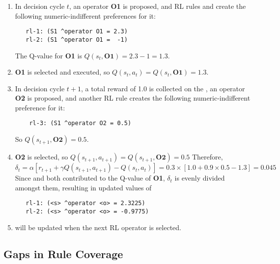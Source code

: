 \begin{enumerate}

\item In decision cycle $t$, an operator \textbf{O1} is proposed, and RL rules  and  create the following numeric-indifferent preferences for it:
\begin{verbatim}
   rl-1: (S1 ^operator O1 = 2.3)
   rl-2: (S1 ^operator O1 =  -1)
\end{verbatim}  
	The Q-value for \textbf{O1} is $Q(s_t, \textbf{O1}) = 2.3 - 1 = 1.3$.
	 
\item \textbf{O1} is selected and executed, so $Q(s_t, a_t) = Q(s_t, \textbf{O1}) = 1.3$.

\item In decision cycle $t+1$, a total reward of 1.0 is collected on the , an operator \textbf{O2} is proposed, and another RL rule  creates the following numeric-indifferent preference for it:
\begin{verbatim}
	rl-3: (S1 ^operator O2 = 0.5)
\end{verbatim}
	So $Q(s_{t+1}, \textbf{O2}) = 0.5$.

\item \textbf{O2} is selected, so $Q(s_{t+1}, a_{t+1}) = Q(s_{t+1}, \textbf{O2}) = 0.5$
	Therefore, 
	$$\delta_t = \alpha \left[r_{t+1} + \gamma Q(s_{t+1}, a_{t+1}) - Q(s_t, a_t) \right] = 0.3 \times [ 1.0 + 0.9 \times 0.5 - 1.3 ] = 0.045$$
	Since  and  both contributed to the Q-value of \textbf{O1}, $\delta_t$ is evenly divided amongst them, resulting in updated values of
\begin{verbatim}
   rl-1: (<s> ^operator <o> = 2.3225)
   rl-2: (<s> ^operator <o> = -0.9775)
\end{verbatim}

\item {} will be updated when the next RL operator is selected.
\end{enumerate}

\subsection{Gaps in Rule Coverage}
\label{RL-gaps}


